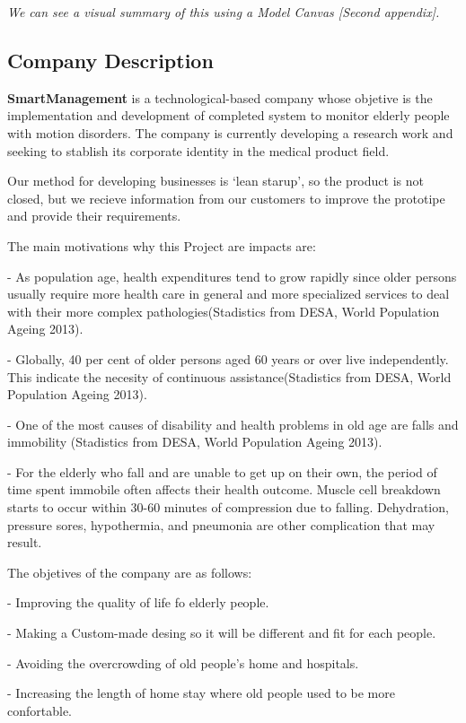 \textit{We can see a visual summary of this using a Model Canvas [Second appendix].}
\vfill
\subsection{Company Description}
\textbf{SmartManagement} is a technological-based company whose objetive is the implementation and development of completed system to monitor elderly people with motion disorders. The company is currently developing a research work and seeking to stablish its corporate identity in the medical product field.

Our method for developing businesses is ‘lean starup’, so the product is not closed, but we recieve information from our customers to improve the prototipe and provide their requirements.

The main motivations why this Project are impacts are:

-	As population age, health expenditures tend to grow rapidly since older persons usually require more health care in general and more specialized services to deal with their more complex pathologies(Stadistics from DESA,  World Population Ageing 2013\cite{desa}).

-	Globally, 40 per cent of older persons aged 60 years or over live independently. This indicate the necesity of continuous assistance(Stadistics from DESA,  World Population Ageing 2013\cite{desa}).

-	One of the most causes of disability and health problems in old age are falls and immobility (Stadistics from DESA,  World Population Ageing 2013\cite{desa}).

-	For the elderly who fall and are unable to get up on their own, the period of time spent immobile often affects their health outcome. Muscle cell breakdown starts to occur within 30-60 minutes of compression due to falling. Dehydration, pressure sores, hypothermia, and pneumonia are other complication that may result\cite{A.Olivares2013}.

The objetives of the company are as follows:

-	Improving the quality of life fo elderly people.

-	Making a Custom-made desing so it will be different and fit for each people.

-	Avoiding the overcrowding of old people’s home and hospitals.

-	Increasing the length of home stay where old people used to be more confortable.

